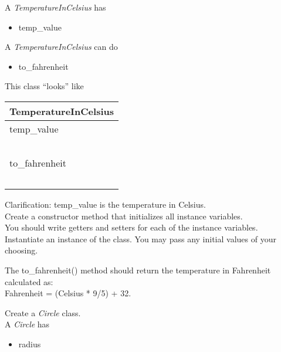 \documentclass{article}
\newcommand{\tab}{\hspace*{0.25in}}
\begin{document}
\begin{enumerate}
\begin{minipage}{.6\textwidth}
		A \textit{TemperatureInCelsius} has
		\begin{itemize}
			\item temp\_value
		\end{itemize}

		A \textit{TemperatureInCelsius} can do
		\begin{itemize}
			\item to\_fahrenheit
		\end{itemize}
	\end{minipage}
	\begin{minipage}{.4\textwidth}
		This class ``looks'' like 
				
		\vspace*{1em}
		\begin{tabular}{|l|}
			\hline TemperatureInCelsius\\ \hline
			temp\_value\\ \ \\  \hline
			to\_fahrenheit\\ \ \\ \hline
		\end{tabular}
	\end{minipage}



	\vspace*{2ex}
	Clarification: temp\_value is the temperature in Celsius.\\
	Create a constructor method that initializes all instance variables.\\
	You should write getters and setters for each of the instance variables.\\
	Instantiate an instance of the class. You may pass any initial values of your choosing.
	
	The to\_fahrenheit() method should return the temperature in Fahrenheit calculated as:\\
	Fahrenheit = (Celsius * 9/5) + 32.\




	\begin{minipage}{.6\textwidth}
	\item Create a \textit{Circle} class.\\		
		A \textit{Circle} has
		\begin{itemize}
			\item radius 
		\end{itemize}


\end{minipage}
\end{enumerate}
\end{document}
